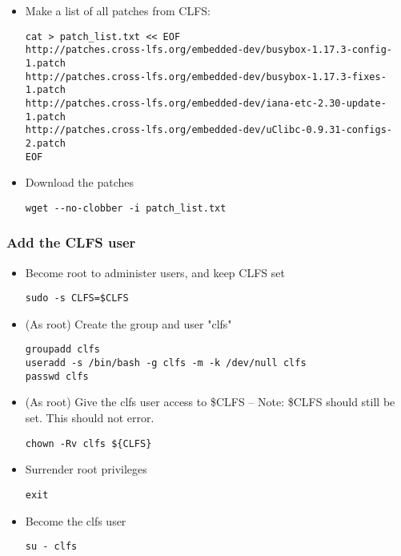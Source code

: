 \begin{itemize}
  \item Make a list of all patches from CLFS:
  \begin{lstlisting}
cat > patch_list.txt << EOF
http://patches.cross-lfs.org/embedded-dev/busybox-1.17.3-config-1.patch
http://patches.cross-lfs.org/embedded-dev/busybox-1.17.3-fixes-1.patch
http://patches.cross-lfs.org/embedded-dev/iana-etc-2.30-update-1.patch
http://patches.cross-lfs.org/embedded-dev/uClibc-0.9.31-configs-2.patch
EOF
  \end{lstlisting}
  \item Download the patches
  \begin{lstlisting}
wget --no-clobber -i patch_list.txt
  \end{lstlisting}
\end{itemize}

 \subsubsection{Add the CLFS user}
 \begin{itemize}
   \item Become root to administer users, and keep CLFS set
\begin{lstlisting}
sudo -s CLFS=$CLFS
\end{lstlisting}
   \item (As root) Create the group and user "clfs"
     \begin{lstlisting}
groupadd clfs
useradd -s /bin/bash -g clfs -m -k /dev/null clfs
passwd clfs
     \end{lstlisting}
  \item (As root) Give the clfs user access to \$CLFS -- Note: \$CLFS should still be set. This should not error.
    \begin{lstlisting}
chown -Rv clfs ${CLFS}
    \end{lstlisting}
 \item Surrender root privileges
\begin{lstlisting}
exit
\end{lstlisting}
 \item Become the clfs user
   \begin{lstlisting}
su - clfs
   \end{lstlisting}
 \end{itemize}
